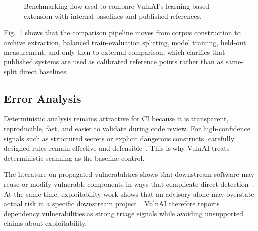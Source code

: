 \documentclass[conference]{IEEEtran}
\begin{document}
\begin{figure}[htbp]
\centering
{}
\caption{Benchmarking flow used to compare VulnAI's learning-based extension with internal baselines and published references.}
\label{fig:benchmark_flow}
\end{figure}

Fig.~\ref{fig:benchmark_flow} shows that the comparison pipeline moves from corpus construction to archive extraction, balanced train-evaluation splitting, model training, held-out measurement, and only then to external comparison, which clarifies that published systems are used as calibrated reference points rather than as same-split direct baselines.

\subsection{Error Analysis}
Deterministic analysis remains attractive for CI because it is transparent, reproducible, fast, and easier to validate during code review. For high-confidence signals such as structured secrets or explicit dangerous constructs, carefully designed rules remain effective and defensible~\cite{meli2019how}. This is why VulnAI treats deterministic scanning as the baseline control.

The literature on propagated vulnerabilities shows that downstream software may reuse or modify vulnerable components in ways that complicate direct detection~\cite{woo2022movery,woo2023v1scan}. At the same time, exploitability work shows that an advisory alone may overstate actual risk in a specific downstream project~\cite{deng2025chainfuzz}. VulnAI therefore reports dependency vulnerabilities as strong triage signals while avoiding unsupported claims about exploitability.
\end{document}
